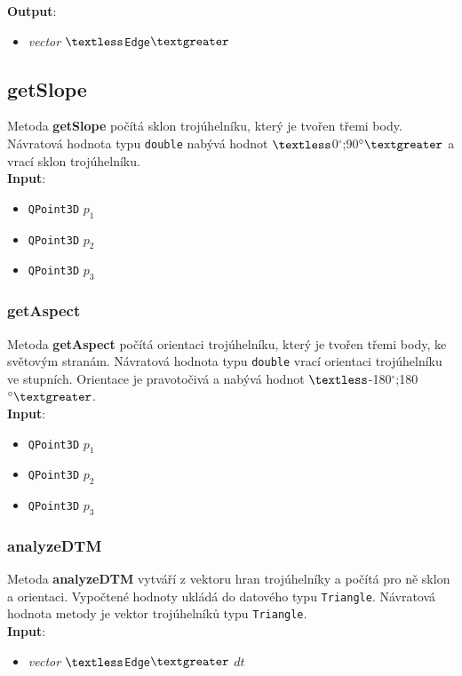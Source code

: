 \documentclass[a4paper, 12pt]{article}
\begin{document}
\textbf{Output}:
\begin{itemize}
\item \textsl{vector} $\textless$\texttt{Edge}$\textgreater$
\end{itemize}

\subsection*{getSlope}
Metoda \textbf{getSlope} počítá sklon trojúhelníku, který je tvořen třemi body. Návratová hodnota typu \texttt{double} nabývá hodnot $\textless$0$^\circ$;90$^\circ\textgreater$ a vrací sklon trojúhelníku.\\

\textbf{Input}:
\begin{itemize}
\item \texttt{QPoint3D} $p_1$
\item \texttt{QPoint3D} $p_2$
\item \texttt{QPoint3D} $p_3$
\end{itemize}

\subsubsection*{getAspect}
Metoda \textbf{getAspect} počítá orientaci trojúhelníku, který je tvořen třemi body, ke světovým stranám. Návratová hodnota typu \texttt{double} vrací orientaci trojúhelníku ve stupních. Orientace je pravotočivá a nabývá hodnot $\textless$-180$^\circ$;180$^\circ\textgreater$.\\

\textbf{Input}:
\begin{itemize}
\item \texttt{QPoint3D} $p_1$
\item \texttt{QPoint3D} $p_2$
\item \texttt{QPoint3D} $p_3$
\end{itemize}

\subsubsection*{analyzeDTM}
Metoda \textbf{analyzeDTM} vytváří z vektoru hran trojúhelníky a počítá pro ně sklon a orientaci. Vypočtené hodnoty ukládá do datového typu \texttt{Triangle}. Návratová hodnota metody je vektor trojúhelníků typu \texttt{Triangle}.\\

\textbf{Input}:
\begin{itemize}
\item \textsl{vector} $\textless$\texttt{Edge}$\textgreater$ $dt$
\end{itemize}
\end{document}
